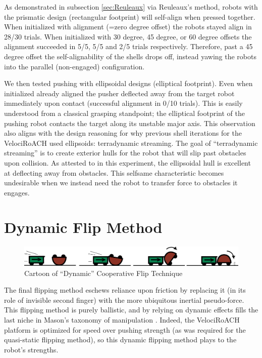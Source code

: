 \documentclass[letterpaper]{report}
\begin{document}
As demonstrated in subsection \ref{sec:Reuleaux} via Reuleaux's method, robots with the prismatic design (rectangular footprint) will self-align when pressed together.
When initialized with alignment (=zero degree offset) the robots stayed align in 28/30 trials.
When initialized with 30 degree, 45 degree, or 60 degree offsets the alignment succeeded in 5/5, 5/5 and 2/5 trials respectively.
Therefore, past a 45 degree offset the self-alignability of the shells drops off, instead yawing the robots into the parallel (non-engaged) configuration.

We then tested pushing with ellipsoidal designs (elliptical footprint).
Even when initialized already aligned the pusher deflected away from the target robot immediately upon contact (successful alignment in 0/10 trials).
This is easily understood from a classical grasping standpoint; the elliptical footprint of the pushing robot contacts the target along its unstable major axis.
This observation also aligns with the design reasoning for why previous shell iterations for the VelociRoACH used ellipsoids: terradynamic streaming.
The goal of ``terradynamic streaming'' is to create exterior hulls for the robot that will slip past obstacles upon collision.
As attested to in this experiment, the ellipsoidal hull is excellent at deflecting away from obstacles.
This selfsame characteristic becomes undesirable when we instead need the robot to transfer force to obstacles it engages.




\chapter{Dynamic Flip Method}
\begin{figure}[ht]
\centering
\includegraphics[width=1.0\textwidth]{Dynamic_CoopCartoon.png}
\caption{Cartoon of ``Dynamic'' Cooperative Flip Technique \label{fig:DynCartoon}}
\end{figure}
The final flipping method eschews reliance upon friction by replacing it (in its role of invisible second finger) with the more ubiquitous inertial pseudo-force.
This flipping method is purely ballistic, and by relying on dynamic effects fills the last niche in Mason's taxonomy of manipulation \cite{MasonMORMBook}.
Indeed, the VelociRoACH platform is optimized for speed over pushing strength (as was required for the quasi-static flipping method), so this dynamic flipping method plays to the robot's strengths.
\end{document}
